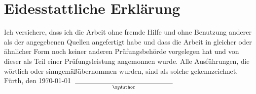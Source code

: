 


\section*{Eidesstattliche Erklärung}


Ich versichere, dass ich die Arbeit ohne fremde Hilfe und ohne Benutzung anderer als der angegebenen Quellen angefertigt habe und dass die Arbeit in gleicher oder \"ahnlicher Form noch keiner anderen Pr\"ufungsbeh\"orde vorgelegen hat und von dieser als Teil einer Pr\"ufungsleistung angemonnen wurde.
Alle Ausf\"uhrungen, die w\"ortlich oder sinngem\"a\ss\;\"ubernommen wurden, sind als solche gekennzeichnet.
\\[4cm]


\noindent
Fürth, den \today~$\underset{\text{\myAuthor}}{\underline{\hspace{5cm}}}$
